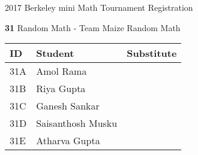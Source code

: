 \documentclass[12pt]{amsart}
\begin{document}
\newpage



\renewcommand{\TeamID}{31}
\renewcommand{\TeamName}{Random Math - Team Maize}
\renewcommand{\SchoolName}{Random Math}
\renewcommand{\IDA}{31A}
\renewcommand{\IDB}{31B}
\renewcommand{\IDC}{31C}
\renewcommand{\IDD}{31D}
\renewcommand{\IDE}{31E}
\renewcommand{\StudentA}{Amol Rama}
\renewcommand{\StudentB}{Riya Gupta}
\renewcommand{\StudentC}{Ganesh Sankar}
\renewcommand{\StudentD}{Saisanthosh Musku}
\renewcommand{\StudentE}{Atharva Gupta}

\begin{center}
{\sc \Large 2017 Berkeley mini Math Tournament Registration}

\bigskip
\bigskip

{\bf \Large  \TeamID} \hfill {\large \TeamName} \hfill {\large \SchoolName}

\bigskip
\bigskip

\begin{tabular}{| p{} | p{} | p{} |}
\hline
\bf ID         & \bf Student             & \bf Substitute             \\ \hline
\IDA           & \StudentA               &                            \\ \hline
\IDB           & \StudentB               &                            \\ \hline
\IDC           & \StudentC               &                            \\ \hline
\IDD           & \StudentD               &                            \\ \hline
\IDE           & \StudentE               &                            \\ \hline
\end{tabular} 
\end{center}
\bigskip
\bigskip

\newpage



\renewcommand{\TeamID}{32}
\renewcommand{\TeamName}{Random Math - Team Purple}
\renewcommand{\SchoolName}{Random Math}
\renewcommand{\IDA}{32A}
\renewcommand{\IDB}{32B}
\renewcommand{\IDC}{32C}
\renewcommand{\IDD}{32D}
\renewcommand{\IDE}{32E}
\renewcommand{\StudentA}{Krishnaveni Parvataneni}
\renewcommand{\StudentB}{Trinav Chaudhury}
\renewcommand{\StudentC}{Saksham Dhuria}
\renewcommand{\StudentD}{Soumily Maji}
\renewcommand{\StudentE}{Ishaani Agrawal}
\end{document}
